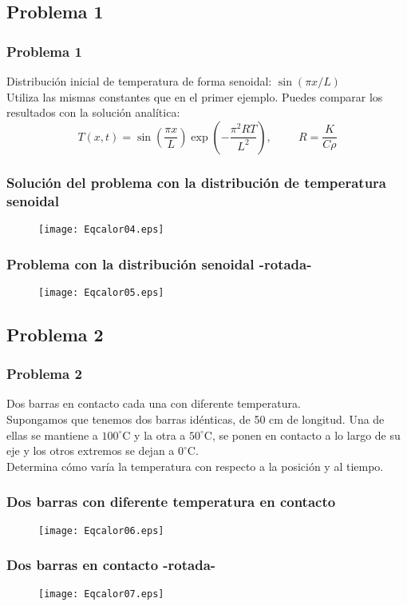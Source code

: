 \subsection{Problema 1}
\begin{frame}
\frametitle{Problema 1}
Distribución inicial de temperatura de forma senoidal: $\sin( \pi x / L)$
\\
\bigskip
Utiliza las mismas constantes que en el primer ejemplo. Puedes comparar los resultados con la solución analítica:
\[ T(x,t) = \sin \left( \dfrac{\pi x}{L} \right) \exp(-\dfrac{\pi^{2}RT}{L^{2}}), \hspace{1cm} R=\dfrac{K}{C \rho} \]
\end{frame}
\begin{frame}
\frametitle{Solución del problema con la distribución de temperatura senoidal}
\begin{figure}
	\centering
	\texttt{[image: Eqcalor04.eps]}  
\end{figure}
\end{frame}
\begin{frame}
\frametitle{Problema con la distribución senoidal -rotada-}
\begin{figure}
	\centering
	\texttt{[image: Eqcalor05.eps]}  
\end{figure}
\end{frame}
\subsection{Problema 2}
\begin{frame}
\frametitle{Problema 2}
Dos barras en contacto cada una con diferente temperatura.
\\
\bigskip
Supongamos que tenemos dos barras idénticas, de 50 cm de longitud. Una de ellas se mantiene a $100^{\circ}$C y la otra a $50^{\circ}$C, se ponen en contacto a lo largo de su eje y los otros extremos se dejan a $0^{\circ}$C.
\\
\bigskip
Determina cómo varía la temperatura con respecto a la posición y al tiempo.
\end{frame}
\begin{frame}
\frametitle{Dos barras con diferente temperatura en contacto}
\begin{figure}
	\centering
	\texttt{[image: Eqcalor06.eps]}  
\end{figure}
\end{frame}
\begin{frame}
\frametitle{Dos barras en contacto -rotada-}
\begin{figure}
	\centering
	\texttt{[image: Eqcalor07.eps]}  
\end{figure}
\end{frame}
